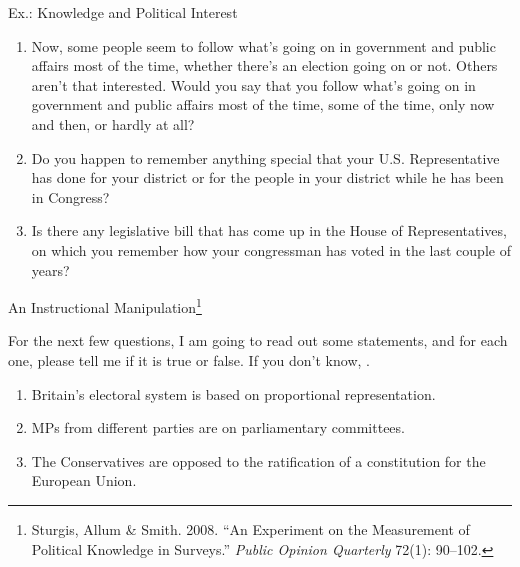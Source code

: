 \documentclass[
  ignorenonframetext,
]{beamer}
\begin{document}
\begin{frame}{\normalsize Ex.: Knowledge and Political Interest}
\protect\hypertarget{ex.-knowledge-and-political-interest-1}{}
\footnotesize

\begin{enumerate}
\item Now, some people seem to follow what's going on in government and public affairs most of the time, whether there's an election going on or not. Others aren't that interested. Would you say that you follow what's going on in government and public affairs most of the time, some of the time, only now and then, or hardly at all?
\item Do you happen to remember anything special that your U.S. Representative has done for your district or for the people in your district while he has been in Congress?
\item Is there any legislative bill that has come up in the House of Representatives, on which you remember how your congressman has voted in the last couple of years?
\end{enumerate}
\end{frame}

\begin{frame}{An Instructional
Manipulation\footnote{Sturgis, Allum \& Smith. 2008. ``An Experiment on the Measurement of Political Knowledge in Surveys.'' \textit{Public Opinion Quarterly} 72(1): 90--102.}}
\protect\hypertarget{an-instructional-manipulation}{}
\small

For the next few questions, I am going to read out some statements, and
for each one, please tell me if it is true or false. If you don't know,
.

\begin{enumerate}\footnotesize
\item Britain's electoral system is based on proportional representation.
\item MPs from different parties are on parliamentary committees.
\item The Conservatives are opposed to the ratification of a constitution for the European Union.
\end{enumerate}
\end{frame}
\end{document}
